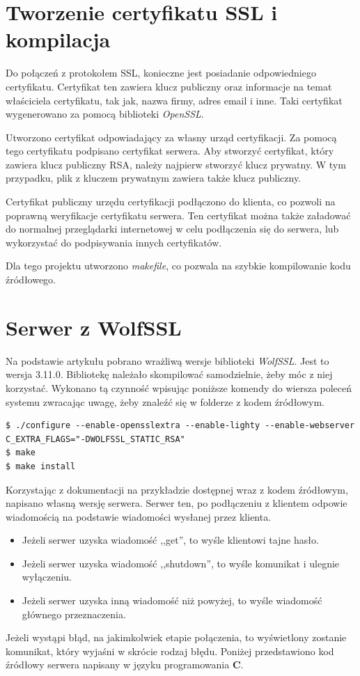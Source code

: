 \documentclass[12pt,twoside,a4]{mwbk}
\theoremstyle{definition}
\begin{document}
\section{Tworzenie certyfikatu SSL i kompilacja}
Do połączeń z protokołem SSL, konieczne jest posiadanie odpowiedniego certyfikatu. Certyfikat ten zawiera klucz publiczny oraz informacje na temat właściciela certyfikatu, tak jak, nazwa firmy, adres email i inne. Taki certyfikat wygenerowano za pomocą biblioteki \textit{OpenSSL}. \\ \par
Utworzono certyfikat odpowiadający za własny urząd certyfikacji. Za pomocą tego certyfikatu podpisano certyfikat serwera. Aby stworzyć certyfikat, który zawiera klucz publiczny RSA, należy najpierw stworzyć klucz prywatny. W tym przypadku, plik z kluczem prywatnym zawiera także klucz publiczny. \\ \par
Certyfikat publiczny urzędu certyfikacji podłączono do klienta, co pozwoli na poprawną weryfikacje certyfikatu serwera. Ten certyfikat można także załadować do normalnej przeglądarki internetowej w celu podłączenia się do serwera, lub wykorzystać do podpisywania innych certyfikatów. \\ \par
Dla tego projektu utworzono \textit{makefile}, co pozwala na szybkie kompilowanie kodu źródłowego.

\section{Serwer z WolfSSL}
Na podstawie artykułu \cite{robot} pobrano wrażliwą wersje biblioteki \textit{WolfSSL}. Jest to wersja 3.11.0. Bibliotekę należało skompilować samodzielnie, żeby móc z niej korzystać. Wykonano tą czynność wpisując poniższe komendy do wiersza poleceń systemu zwracając uwagę, żeby znaleźć się w folderze z kodem źródłowym.
\begin{lstlisting}
$ ./configure --enable-opensslextra --enable-lighty --enable-webserver C_EXTRA_FLAGS="-DWOLFSSL_STATIC_RSA"
$ make
$ make install
\end{lstlisting}
Korzystając z dokumentacji na przykładzie dostępnej wraz z kodem źródłowym, napisano własną wersję serwera. Serwer ten, po podłączeniu z klientem odpowie wiadomością na podstawie wiadomości wysłanej przez klienta.
\begin{itemize}
\item Jeżeli serwer uzyska wiadomość ,,get'', to wyśle klientowi tajne hasło.
\item Jeżeli serwer uzyska wiadomość ,,shutdown'', to wyśle komunikat i ulegnie wyłączeniu.
\item Jeżeli serwer uzyska inną wiadomość niż powyżej, to wyśle wiadomość głównego przeznaczenia.
\end{itemize}
Jeżeli wystąpi błąd, na jakimkolwiek etapie połączenia, to wyświetlony zostanie komunikat, który wyjaśni w skrócie rodzaj błędu. Poniżej przedstawiono kod źródłowy serwera napisany w języku programowania \textbf{C}.
\end{document}
